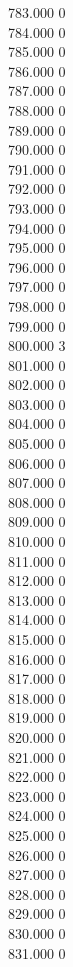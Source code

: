 { 783.000	0 \\
 784.000	0 \\
 785.000	0 \\
 786.000	0 \\
 787.000	0 \\
 788.000	0 \\
 789.000	0 \\
 790.000	0 \\
 791.000	0 \\
 792.000	0 \\
 793.000	0 \\
 794.000	0 \\
 795.000	0 \\
 796.000	0 \\
 797.000	0 \\
 798.000	0 \\
 799.000	0 \\
 800.000	3 \\
 801.000	0 \\
 802.000	0 \\
 803.000	0 \\
 804.000	0 \\
 805.000	0 \\
 806.000	0 \\
 807.000	0 \\
 808.000	0 \\
 809.000	0 \\
 810.000	0 \\
 811.000	0 \\
 812.000	0 \\
 813.000	0 \\
 814.000	0 \\
 815.000	0 \\
 816.000	0 \\
 817.000	0 \\
 818.000	0 \\
 819.000	0 \\
 820.000	0 \\
 821.000	0 \\
 822.000	0 \\
 823.000	0 \\
 824.000	0 \\
 825.000	0 \\
 826.000	0 \\
 827.000	0 \\
 828.000	0 \\
 829.000	0 \\
 830.000	0 \\
 831.000	0 \\
}
